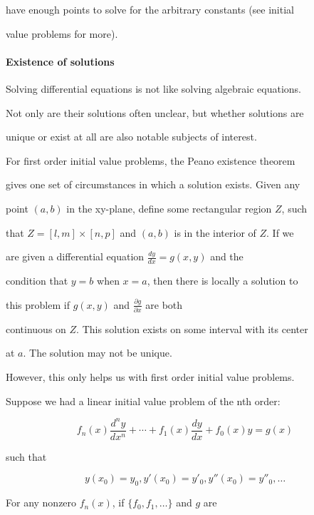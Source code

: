 have enough points to solve for the arbitrary constants (see initial

value problems for more).



\paragraph{Existence of solutions}



Solving differential equations is not like solving algebraic equations.

Not only are their solutions often unclear, but whether solutions are

unique or exist at all are also notable subjects of interest.



For first order initial value problems, the Peano existence theorem

gives one set of circumstances in which a solution exists. Given any

point $(a,b)$ in the xy-plane, define some rectangular region $Z$, such

that $Z = [l,m]\times[n,p]$ and $(a,b)$ is in the interior of $Z$. If we

are given a differential equation $\frac{dy}{dx} = g(x,y)$ and the

condition that $y=b$ when $x=a$, then there is locally a solution to

this problem if $g(x,y)$ and $\frac{\partial g}{\partial x}$ are both

continuous on $Z$. This solution exists on some interval with its center

at $a$. The solution may not be unique.



However, this only helps us with first order initial value problems.

Suppose we had a linear initial value problem of the nth order:



$$f_{n}(x)\frac{d^n y}{dx^n} + \cdots + f_{1}(x)\frac{d y}{dx} + f_{0}(x)y = g(x)$$

such that



$$y(x_{0})=y_{0}, y'(x_{0}) = y'_{0}, y''(x_{0}) = y''_{0}, \ldots$$



For any nonzero $f_{n}(x)$, if $\{f_{0},f_{1},\ldots\}$ and $g$ are

